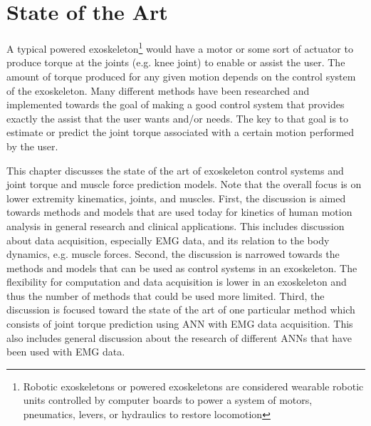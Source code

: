 \chapter{State of the Art}
A typical powered exoskeleton\footnote{Robotic exoskeletons or powered exoskeletons are considered wearable robotic units controlled by computer boards to power a system of motors, pneumatics,
levers, or hydraulics to restore locomotion} would have a motor or some sort of actuator to produce torque at the joints (e.g. knee joint) to enable or assist the user.
The amount of torque produced for any given motion depends on the control system of the exoskeleton.
Many different methods have been researched and implemented towards the goal of making a good control system that provides exactly the assist that the user wants and/or needs.
The key to that goal is to estimate or predict the joint torque associated with a certain motion performed by the user.

This chapter discusses the state of the art of exoskeleton control systems and joint torque and muscle force prediction models.
Note that the overall focus is on lower extremity kinematics, joints, and muscles.
First, the discussion is aimed towards methods and models that are used today for kinetics of human motion analysis in general research and clinical applications.
This includes discussion about data acquisition, especially \ac{EMG} data, and its relation to the body dynamics, e.g. muscle forces.
Second, the discussion is narrowed towards the methods and models that can be used as control systems in an exoskeleton.
The flexibility for computation and data acquisition is lower in an exoskeleton and thus the number of methods that could be used more limited.
Third, the discussion is focused toward the state of the art of one particular method which consists of joint torque prediction using \ac{ANN} with \ac{EMG} data acquisition. 
This also includes general discussion about the research of different \acp{ANN} that have been used with \ac{EMG} data.


